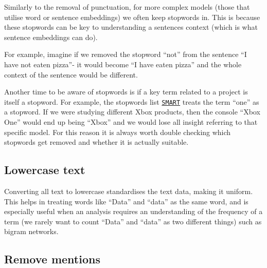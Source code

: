 \documentclass[
  letterpaper,
  DIV=11,
  numbers=noendperiod]{scrreprt}
\begin{document}
\begin{tcolorbox}[enhanced jigsaw, opacitybacktitle=0.6, breakable, title=\textcolor{quarto-callout-tip-color}{\faLightbulb}\hspace{0.5em}{Warning on stopword removal}, arc=.35mm, colframe=quarto-callout-tip-color-frame, colbacktitle=quarto-callout-tip-color!10!white, left=2mm, bottomrule=.15mm, opacityback=0, toprule=.15mm, bottomtitle=1mm, toptitle=1mm, titlerule=0mm, leftrule=.75mm, colback=white, rightrule=.15mm, coltitle=black]

Similarly to the removal of punctuation, for more complex models (those
that utilise word or sentence embeddings) we often keep stopwords in.
This is because these stopwords can be key to understanding a sentences
context (which is what sentence embeddings can do).

For example, imagine if we removed the stopword ``not'' from the
sentence ``I have not eaten pizza''- it would become ``I have eaten
pizza'' and the whole context of the sentence would be different.

Another time to be aware of stopwords is if a key term related to a
project is itself a stopword. For example, the stopwords list
\href{https://search.r-project.org/CRAN/refmans/stopwords/html/data_stopwords_smart.html}{\texttt{SMART}}
treats the term ``one'' as a stopword. If we were studying different
Xbox products, then the console ``Xbox One'' would end up being ``Xbox''
and we would lose all insight referring to that specific model. For this
reason it is always worth double checking which stopwords get removed
and whether it is actually suitable.

\end{tcolorbox}

\subsection{Lowercase text}\label{lowercase-text}

Converting all text to lowercase standardises the text data, making it
uniform. This helps in treating words like ``Data'' and ``data'' as the
same word, and is especially useful when an analysis requires an
understanding of the frequency of a term (we rarely want to count
``Data'' and ``data'' as two different things) such as bigram networks.

\subsection{Remove mentions}\label{remove-mentions}
\end{document}
